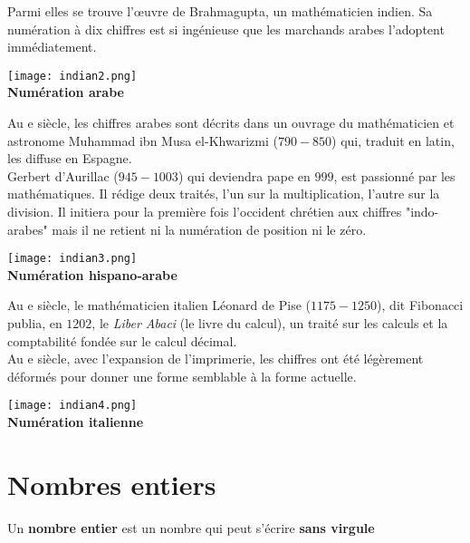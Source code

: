 \begin{pageCours}
\begin{His}
Parmi elles se trouve l'œuvre de Brahmagupta, un mathématicien indien. Sa numération à dix chiffres est si ingénieuse que les marchands arabes l'adoptent immédiatement.

\begin{center}
\texttt{[image: indian2.png]}\\
\textbf{Numération arabe}
\end{center}
\end{His}

\begin{His}
Au e siècle, les chiffres arabes sont décrits dans un ouvrage du mathématicien et astronome Muhammad ibn Musa el-Khwarizmi ($790-850$) qui, traduit en latin, les diffuse en Espagne.\\

Gerbert d'Aurillac ($945-1003$) qui deviendra pape en $999$, est passionné par les mathématiques. Il rédige deux traités, l'un sur la multiplication, l'autre sur la division. Il initiera pour la première fois l'occident chrétien aux chiffres "indo-arabes" mais il ne retient ni la numération de position ni le zéro. 

\begin{center}
\texttt{[image: indian3.png]}\\
\textbf{Numération hispano-arabe}
\end{center}

Au e siècle, le mathématicien italien Léonard de Pise ($1175-1250$), dit Fibonacci publia, en $1202$, le \textit{Liber Abaci} (le livre du calcul), un traité sur les calculs et la comptabilité fondée sur le calcul décimal.\\

Au e siècle, avec l'expansion de l'imprimerie, les chiffres ont été légèrement déformés pour donner une forme semblable à la forme actuelle. 

\begin{center}
\texttt{[image: indian4.png]}\\
\textbf{Numération italienne}
\end{center}
\end{His}

\section{Nombres entiers}

\begin{Def}
Un \textbf{nombre entier} est un nombre qui peut s'écrire \textbf{sans virgule}
\end{Def}


\end{pageCours}
